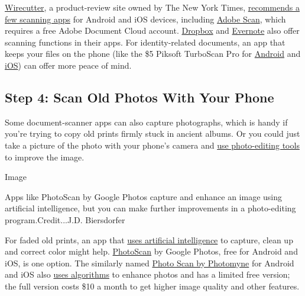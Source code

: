 \href{https://thewirecutter.com}{Wirecutter}, a product-review site
owned by The New York Times,
\href{https://thewirecutter.com/reviews/best-mobile-scanning-apps/}{recommends
a few scanning apps} for Android and iOS devices, including
\href{https://acrobat.adobe.com/us/en/mobile/scanner-app.html}{Adobe
Scan}, which requires a free Adobe Document Cloud account.
\href{https://www.dropbox.com/features/productivity/doc-scanner-app}{Dropbox}
and \href{https://evernote.com/features/document-scanning}{Evernote}
also offer scanning functions in their apps. For identity-related
documents, an app that keeps your files on the phone (like the \$5
Piksoft TurboScan Pro for
\href{https://play.google.com/store/apps/details?id=com.piksoft.turboscan.free\&hl=en_US}{Android}
and
\href{https://apps.apple.com/us/app/turboscan-pro-pdf-scanner/id342548956}{iOS})
can offer more peace of mind.

\hypertarget{step-4-scan-old-photos-with-your-phone}{%
\subsection{Step 4: Scan Old Photos With Your
Phone}\label{step-4-scan-old-photos-with-your-phone}}

Some document-scanner apps can also capture photographs, which is handy
if you're trying to copy old prints firmly stuck in ancient albums. Or
you could just take a picture of the photo with your phone's camera and
\href{https://www.nytimes3xbfgragh.onion/2018/12/19/technology/personaltech/how-to-rescue-repair-and-revive-old-family-photos.html}{use
photo-editing tools} to improve the image.

Image

Apps like PhotoScan by Google Photos capture and enhance an image using
artificial intelligence, but you can make further improvements in a
photo-editing program.Credit...J.D. Biersdorfer

For faded old prints, an app that
\href{https://ai.googleblog.com/2017/04/photoscan-taking-glare-free-pictures-of.html}{uses
artificial intelligence} to capture, clean up and correct color might
help. \href{https://www.google.com/photos/scan/}{PhotoScan} by Google
Photos, free for Android and iOS, is one option. The similarly named
\href{https://photomyne.com/get-photomyne}{Photo Scan by Photomyne} for
Android and iOS also \href{https://photomyne.com/algorithm}{uses
algorithms} to enhance photos and has a limited free version; the full
version costs \$10 a month to get higher image quality and other
features.

